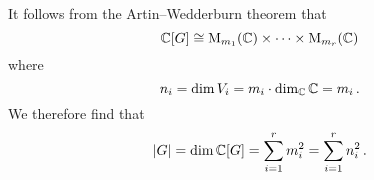 \section{}

It follows from the Artin--Wedderburn theorem that
\[
  \mathbb{C}[G]
  \cong
  \operatorname{M}_{m_1}(\mathbb{C})
  \times
  \dotsb
  \times
  \operatorname{M}_{m_r}(\mathbb{C})
\]
where
\[
  n_i
  =
  \dim V_i
  =
  m_i \cdot \dim_{\mathbb{C}} \mathbb{C}
  =
  m_i \,.
\]
We therefore find that
\[
  \lvert G\rvert
  =
  \dim \mathbb{C}[G]
  =
  \sum_{i=1}^r m_i^2
  =
  \sum_{i=1}^r n_i^2  \,.
\]




